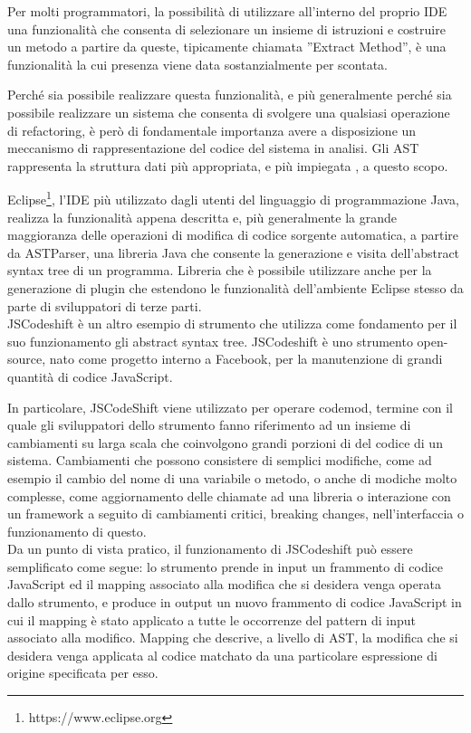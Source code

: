 Per molti programmatori, la possibilità di utilizzare all’interno del proprio
IDE una funzionalità che consenta di selezionare un insieme di istruzioni e
costruire un metodo a partire da queste, tipicamente chiamata ”Extract Method”,
è una funzionalità la cui presenza viene data sostanzialmente per scontata.

Perché sia possibile realizzare questa funzionalità, e più generalmente perché
sia possibile realizzare un sistema che consenta di svolgere una qualsiasi
operazione di refactoring, è però di fondamentale importanza avere a
disposizione un meccanismo di rappresentazione del codice del sistema in
analisi. Gli AST rappresenta la struttura dati più appropriata, e più impiegata
\cite{eclipse2006} \cite{netbeans2007}, a questo scopo.

Eclipse\footnote{https://www.eclipse.org}, l’IDE più utilizzato dagli utenti del
linguaggio di programmazione Java, realizza la funzionalità appena descritta e,
più generalmente la grande maggioranza delle operazioni di modifica di codice
sorgente automatica, a partire da ASTParser, una libreria Java che consente la
generazione e visita dell’abstract syntax tree di un programma. Libreria che è
possibile utilizzare anche per la generazione di plugin che estendono le
funzionalità dell’ambiente Eclipse stesso da parte di sviluppatori di terze
parti.\\

JSCodeshift \cite{jscodeshift2016} è un altro esempio di strumento che utilizza
come fondamento per il suo funzionamento gli abstract syntax tree. JSCodeshift
è uno strumento open-source, nato come progetto interno a Facebook\texttrademark,
per la manutenzione di grandi quantità di codice JavaScript.

In particolare, JSCodeShift viene utilizzato per operare codemod, termine con il
quale gli sviluppatori dello strumento fanno riferimento ad un insieme di
cambiamenti su larga scala che coinvolgono grandi porzioni di del codice di un
sistema. Cambiamenti che possono consistere di semplici modifiche, come ad
esempio il cambio del nome di una variabile o metodo, o anche di modiche molto
complesse, come aggiornamento delle chiamate ad una libreria o interazione con
un framework a seguito di cambiamenti critici, breaking changes,
nell'interfaccia o funzionamento di questo.\\

Da un punto di vista pratico, il funzionamento di JSCodeshift può essere
semplificato come segue: lo strumento prende in input un frammento di codice
JavaScript ed il mapping associato alla modifica che si desidera venga operata
dallo strumento, e produce in output un nuovo frammento di codice JavaScript in
cui il mapping è stato applicato a tutte le occorrenze del pattern di input
associato alla modifico. Mapping che descrive, a livello di AST, la modifica che
si desidera venga applicata al codice matchato da una particolare espressione di
origine specificata per esso.

